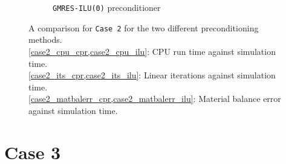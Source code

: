 \begin{figure}
\begin{subfigure}{.5\textwidth}
  \caption{\texttt{GMRES-ILU(0)} preconditioner}
	\label{case2_matbalerr_ilu}
\end{subfigure}
\caption[caption]{A comparison for \texttt{Case 2} for the two different preconditioning methods.\\\hspace{\textwidth}
		\cref{case2_cpu_cpr,case2_cpu_ilu}: CPU run time against simulation time. \\\hspace{\textwidth}
		\cref{case2_its_cpr,case2_its_ilu}: Linear iterations against simulation time.\\\hspace{\textwidth}
		\cref{case2_matbalerr_cpr,case2_matbalerr_ilu}: Material balance error against simulation time.}
\label{case2_param}
\end{figure}
\clearpage

\section{Case 3}

